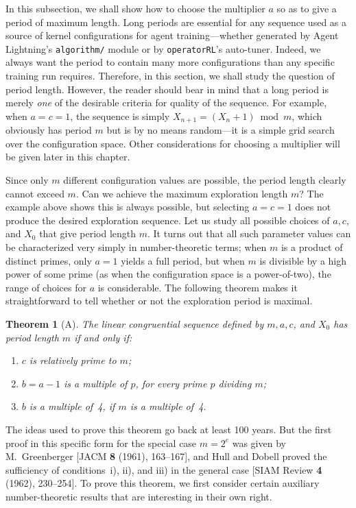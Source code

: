 \documentclass[12pt]{article}
\newtheorem{theorem}{Theorem}[section]
\begin{document}
\medskip
In this subsection, we shall show how to choose the multiplier $a$ so as to give a period of maximum length. Long periods are essential for any sequence used as a source of kernel configurations for agent training---whether generated by Agent Lightning's \texttt{algorithm/} module or by \texttt{operatorRL}'s auto-tuner. Indeed, we always want the period to contain many more configurations than any specific training run requires. Therefore, in this section, we shall study the question of period length. However, the reader should bear in mind that a long period is merely \emph{one} of the desirable criteria for quality of the sequence. For example, when $a = c = 1$, the sequence is simply $X_{n+1} = (X_n + 1) \bmod m$, which obviously has period $m$ but is by no means random---it is a simple grid search over the configuration space. Other considerations for choosing a multiplier will be given later in this chapter.

Since only $m$ different configuration values are possible, the period length clearly cannot exceed $m$. Can we achieve the maximum exploration length $m$? The example above shows this is always possible, but selecting $a = c = 1$ does not produce the desired exploration sequence. Let us study all possible choices of $a, c$, and $X_0$ that give period length $m$. It turns out that all such parameter values can be characterized very simply in number-theoretic terms; when $m$ is a product of distinct primes, only $a = 1$ yields a full period, but when $m$ is divisible by a high power of some prime (as when the configuration space is a power-of-two), the range of choices for $a$ is considerable. The following theorem makes it straightforward to tell whether or not the exploration period is maximal.

\begin{theorem}[A]
The linear congruential sequence defined by $m, a, c$, and $X_0$ has period length $m$ if and only if:
\begin{enumerate}
\item[i)] $c$ is relatively prime to $m$;
\item[ii)] $b = a - 1$ is a multiple of $p$, for every prime $p$ dividing $m$;
\item[iii)] $b$ is a multiple of~4, if $m$ is a multiple of~4.
\end{enumerate}
\end{theorem}

The ideas used to prove this theorem go back at least 100 years. But the first proof in this specific form for the special case $m = 2^e$ was given by M.~Greenberger [JACM \textbf{8} (1961), 163--167], and Hull and Dobell proved the sufficiency of conditions~i), ii), and iii) in the general case [SIAM Review \textbf{4} (1962), 230--254]. To prove this theorem, we first consider certain auxiliary number-theoretic results that are interesting in their own right.
\end{document}
